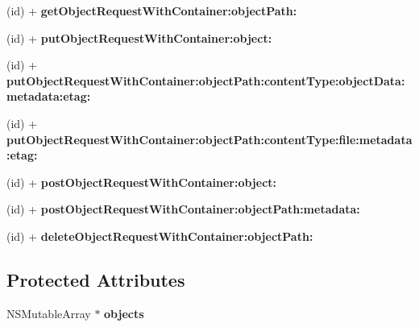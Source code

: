 \begin{DoxyCompactItemize}
\item 
\hypertarget{interface_a_s_i_cloud_files_object_request_ac41ac1686f40dd0b25f473b95de56a2b}{
(id) + {\bfseries get\-Object\-Request\-With\-Container\-:object\-Path\-:}}
\label{interface_a_s_i_cloud_files_object_request_ac41ac1686f40dd0b25f473b95de56a2b}

\item 
\hypertarget{interface_a_s_i_cloud_files_object_request_ac9c57b5595d42ea6fdb13b9baa5ad073}{
(id) + {\bfseries put\-Object\-Request\-With\-Container\-:object\-:}}
\label{interface_a_s_i_cloud_files_object_request_ac9c57b5595d42ea6fdb13b9baa5ad073}

\item 
\hypertarget{interface_a_s_i_cloud_files_object_request_a51fd51b32cb64756aa6fbc3f50ff7df4}{
(id) + {\bfseries put\-Object\-Request\-With\-Container\-:object\-Path\-:content\-Type\-:object\-Data\-:metadata\-:etag\-:}}
\label{interface_a_s_i_cloud_files_object_request_a51fd51b32cb64756aa6fbc3f50ff7df4}

\item 
\hypertarget{interface_a_s_i_cloud_files_object_request_a4fd2c82bc1702341d5a482f7ff46db4b}{
(id) + {\bfseries put\-Object\-Request\-With\-Container\-:object\-Path\-:content\-Type\-:file\-:metadata\-:etag\-:}}
\label{interface_a_s_i_cloud_files_object_request_a4fd2c82bc1702341d5a482f7ff46db4b}

\item 
\hypertarget{interface_a_s_i_cloud_files_object_request_ae713a0e0f7867895b33210be74770c47}{
(id) + {\bfseries post\-Object\-Request\-With\-Container\-:object\-:}}
\label{interface_a_s_i_cloud_files_object_request_ae713a0e0f7867895b33210be74770c47}

\item 
\hypertarget{interface_a_s_i_cloud_files_object_request_a594d1d7c8fc812dc9acc2c862809b603}{
(id) + {\bfseries post\-Object\-Request\-With\-Container\-:object\-Path\-:metadata\-:}}
\label{interface_a_s_i_cloud_files_object_request_a594d1d7c8fc812dc9acc2c862809b603}

\item 
\hypertarget{interface_a_s_i_cloud_files_object_request_a55f1c9c4f71e7e3314b23d144b96fbac}{
(id) + {\bfseries delete\-Object\-Request\-With\-Container\-:object\-Path\-:}}
\label{interface_a_s_i_cloud_files_object_request_a55f1c9c4f71e7e3314b23d144b96fbac}

\end{DoxyCompactItemize}
\subsection*{\-Protected \-Attributes}
\begin{DoxyCompactItemize}
\item 
\hypertarget{interface_a_s_i_cloud_files_object_request_aea7a1cdb8a21c769409c7171103145b4}{
\-N\-S\-Mutable\-Array $\ast$ {\bfseries objects}}
\label{interface_a_s_i_cloud_files_object_request_aea7a1cdb8a21c769409c7171103145b4}

\end{DoxyCompactItemize}
